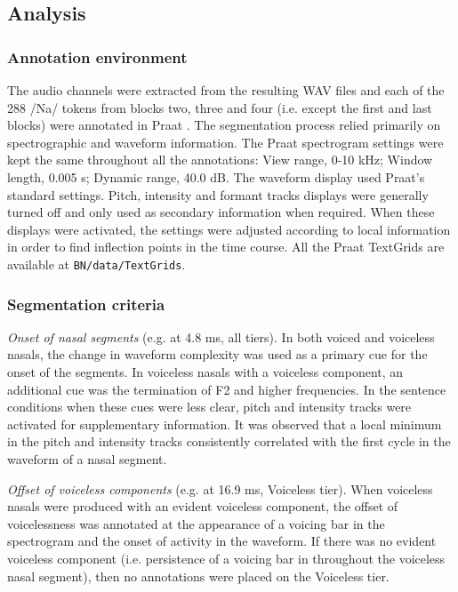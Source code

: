 \documentclass[12pt]{article}
\begin{document}
\subsection{Analysis} %
\label{sub:analysis}

\subsubsection{Annotation environment} %
\label{sub:annotation}

The audio channels were extracted from the resulting WAV files and each of the 288 /Na/ tokens from blocks two, three and four (i.e. except the first and last blocks) were annotated in Praat \citep{boersma2002praat}. The segmentation process relied primarily on spectrographic and waveform information. The Praat spectrogram settings were kept the same throughout all the annotations: View range, 0-10 kHz; Window length, 0.005 s; Dynamic range, 40.0 dB. The waveform display used Praat's standard settings. Pitch, intensity and formant tracks displays were generally turned off and only used as secondary information when required. When these displays were activated, the settings were adjusted according to local information in order to find inflection points in the time course. All the Praat TextGrids are available at \texttt{BN/data/TextGrids}.

\subsubsection{Segmentation criteria} %
\label{sub:segmentation}

\vspace{1em}

\emph{Onset of nasal segments} (e.g.  at 4.8 ms, all tiers). In both voiced and voiceless nasals, the change in waveform complexity was used as a primary cue for the onset of the segments. In voiceless nasals with a voiceless component, an additional cue was the termination of F2 and higher frequencies. In the sentence conditions when these cues were less clear, pitch and intensity tracks were activated for supplementary information. It was observed that a local minimum in the pitch and intensity tracks consistently correlated with the first cycle in the waveform of a nasal segment.

\emph{Offset of voiceless components} (e.g.  at 16.9 ms, Voiceless tier). When voiceless nasals were produced with an evident voiceless component, the offset of voicelessness was annotated at the appearance of a voicing bar in the spectrogram and the onset of activity in the waveform. If there was no evident voiceless component (i.e. persistence of a voicing bar in throughout the voiceless nasal segment), then no annotations were placed on the Voiceless tier.
\end{document}
